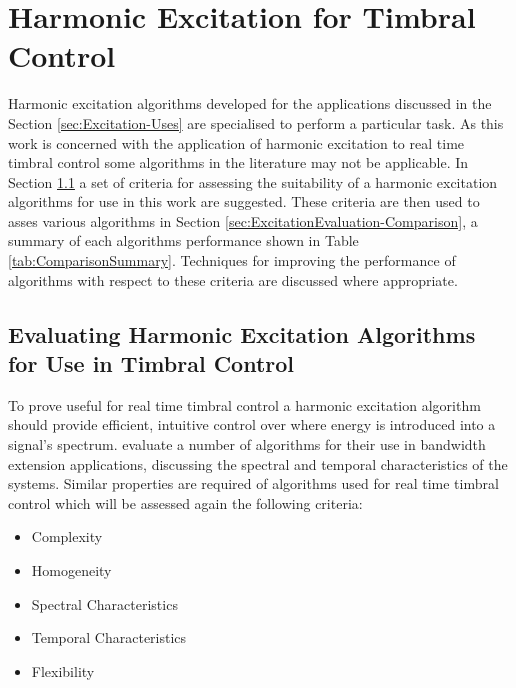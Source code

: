 
\chapter{Harmonic Excitation for Timbral Control}
\label{chap:ExcitationEvaluation}
	Harmonic excitation algorithms developed for the applications discussed in the Section \ref{sec:Excitation-Uses}
	are specialised to perform a particular task. As this work is concerned with the application of harmonic excitation
	to real time timbral control some algorithms in the literature may not be applicable. In Section
	\ref{sec:ExcitationEvaluation-Evaluation} a set of criteria for assessing the suitability of a harmonic excitation
	algorithms for use in this work are suggested. These criteria are then used to asses various algorithms in Section
	\ref{sec:ExcitationEvaluation-Comparison}, a summary of each algorithms performance shown in Table
	\ref{tab:ComparisonSummary}. Techniques for improving the performance of algorithms with respect to these criteria
	are discussed where appropriate.

\section{Evaluating Harmonic Excitation Algorithms for Use in Timbral Control}
\label{sec:ExcitationEvaluation-Evaluation}
	To prove useful for real time timbral control a harmonic excitation algorithm should provide efficient, intuitive
	control over where energy is introduced into a signal's spectrum. \citet{larsen2004audio} evaluate a number of
	algorithms for their use in bandwidth extension applications, discussing the spectral and temporal characteristics
	of the systems. Similar properties are required of algorithms used for real time timbral control which will be
	assessed again the following criteria:

	\begin{itemize}
		\item Complexity
		\item Homogeneity
		\item Spectral Characteristics
		\item Temporal Characteristics
		\item Flexibility
	\end{itemize}

